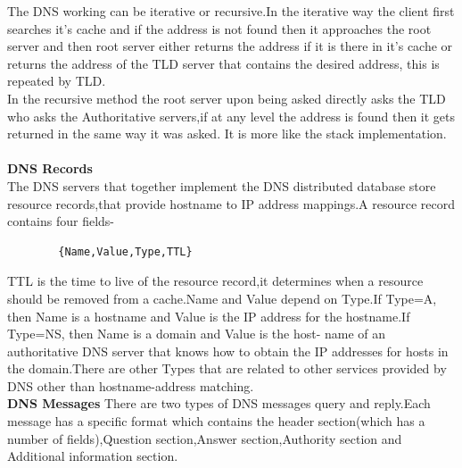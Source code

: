 \documentclass{article}
\begin{document}
The DNS working can be iterative or recursive.In the iterative way the client first searches it's cache and if the address is not found then it approaches the root server and then root server either returns the address if it is there in it's cache or returns the address of the TLD server that contains the desired address, this is repeated by TLD.\\
In the recursive method the root server upon being asked directly asks the TLD who asks the Authoritative servers,if at any level the address is found then it gets returned in the same way it was asked. It is more like the stack implementation.\\\\
\textbf{DNS Records}\\
The DNS servers that together implement the DNS distributed database store resource records,that provide hostname to IP address mappings.A resource record contains four fields-
\begin{center}
    \begin{verbatim}
        {Name,Value,Type,TTL}
    \end{verbatim}
\end{center}
TTL is the time to live of the resource record,it determines when a resource should be removed from a cache.Name and Value depend on Type.If Type=A, then Name is a hostname and Value is the IP address for the hostname.If Type=NS, then Name is a domain and Value is the host- name of an authoritative DNS server that knows how to obtain the IP addresses for hosts in the domain.There are other Types that are related to other services provided by DNS other than hostname-address matching.\\
\textbf{DNS Messages}
There are two types of DNS messages query and reply.Each message has a specific format which contains the header section(which has a number of fields),Question section,Answer section,Authority section and Additional information section.\\
\end{document}
